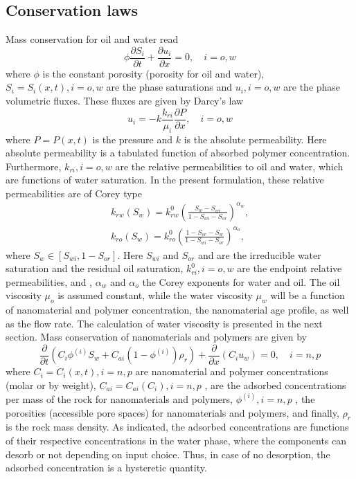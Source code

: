\documentclass[nanomaterials,article,submit,moreauthors,pdftex]{Definitions/mdpi}
\begin{document}
\subsection{Conservation laws}
Mass conservation for oil and water read
\begin{equation} \label{eq:massConservation} %
    \phi\frac{\partial S_i}{\partial t}+\frac{\partial u_i}{\partial x} = 0,\quad i = o, w
\end{equation}
where $\phi$ is the constant porosity (porosity for oil and water), $S_i=S_i(x,t), i = o,w$ are the phase saturations and $u_i, i=o,w$ are the phase volumetric fluxes. These fluxes are given by Darcy’s law
\begin{equation} \label{eq:fluxes} %
    u_i= -k\frac{k_{ri}}{\mu_i}\frac{\partial P}{\partial x},\quad i = o, w
\end{equation}
where $P=P(x,t)$  is the pressure and $k$ is the absolute permeability. Here absolute permeability is a tabulated function of absorbed polymer concentration. Furthermore, $k_{ri}, i = o, w$ are the relative permeabilities to oil and water, which are functions of water saturation. In the present formulation, these relative permeabilities are of Corey type
\begin{subequations}
\begin{eqnarray}
 k_{rw}(S_w)=k^0_{rw}(\frac{S_w-S_{wi}}{1-S_{wi}-S_{or}})^{\alpha_w} ,\\
    k_{ro}(S_w)=k^0_{ro}(\frac{1-S_{or}-S_{w}}{1-S_{wi}-S_{or}})^{\alpha_o} ,
\end{eqnarray}
\end{subequations}
where $S_w\in [S_{wi}, 1-S_{or}]$. Here $S_{wi}$ and $S_{or}$ and are the irreducible water saturation and the residual oil saturation, $k^0_{ri}, i=o,w$  are the endpoint relative permeabilities, and , $\alpha_w$ and $\alpha_o$  the Corey exponents for water and oil. The oil viscosity $\mu_o$ is assumed constant, while the water viscosity $\mu_w$ will be a function of nanomaterial and polymer concentration, the nanomaterial age profile, as well as the flow rate. The calculation of water viscosity is presented in the next section.
Mass conservation of nanomaterials and polymers are given by 
\begin{equation} \label{eq:massConsNPpol} %
    \frac{\partial}{\partial t}(C_i\phi^{(i)}S_w + C_{ai}(1-\phi^{(i)})\rho_r)+ \frac{\partial}{\partial x}(C_i u_w) = 0, \quad i = n, p
\end{equation}
where $C_i=C_i(x,t), i=n,p$ are nanomaterial and polymer concentrations (molar or by weight), $C_{ai}=C_{ai}(C_i), i=n,p$ , are the adsorbed concentrations per mass of the rock for nanomaterials and polymers, $\phi^{(i)}, i=n,p$ , the porosities (accessible pore spaces) for nanomaterials and polymers, and finally, $\rho_r$ is the rock mass density. As indicated, the adsorbed concentrations are functions of their respective concentrations in the water phase, where the components can desorb or not depending on input choice. Thus, in case of no desorption, the adsorbed concentration is a hysteretic quantity.   
\end{document}
